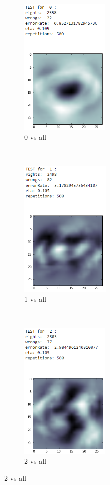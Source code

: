 \documentclass[paper=a4, fontsize=11pt]{scrartcl} %
\numberwithin{equation}{section} %
\numberwithin{figure}{section} %
\numberwithin{table}{section} %
\begin{document}
	\begin{figure}
		\centering
		\begin{subfigure}[t]{0.32\textwidth}
			\centering
			\includegraphics[height=2.6in]{test0}
            \caption*{0 vs all}
		\end{subfigure}%
		~
		\begin{subfigure}[t]{0.32\textwidth}
			\centering
			\includegraphics[height=2.6in]{test1}
            \caption*{1 vs all}
		\end{subfigure}
		~
		\begin{subfigure}[t]{0.32\textwidth}
			\centering
			\includegraphics[height=2.6in]{test2}
            \caption*{2 vs all}

\end{subfigure}
\end{figure}
\end{document}
